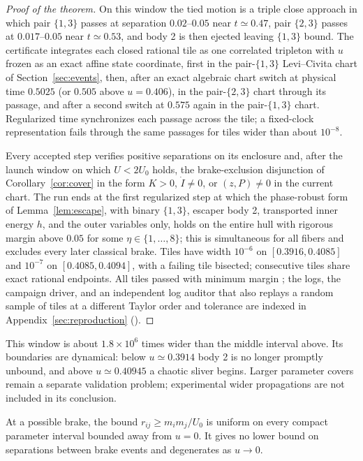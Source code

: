 \begin{proof}[Proof of the theorem]
On this window the tied motion is a triple close approach in which pair
$\{1,3\}$ passes at separation $0.02$--$0.05$ near $t\simeq0.47$, pair
$\{2,3\}$ passes at $0.017$--$0.05$ near $t\simeq0.53$, and body 2 is then
ejected leaving $\{1,3\}$ bound. The certificate integrates each closed
rational tile as one correlated tripleton with $u$ frozen as an exact affine
state coordinate, first in the pair-$\{1,3\}$ Levi--Civita chart of
Section~\ref{sec:events}, then, after an exact algebraic chart switch at
physical time $0.5025$ (or $0.505$ above $u=0.406$), in the pair-$\{2,3\}$
chart through its passage, and after a second switch at $0.575$ again in
the pair-$\{1,3\}$ chart. Regularized time synchronizes each passage across
the tile; a fixed-clock representation fails through the same passages for
tiles wider than about $10^{-8}$.

Every accepted step verifies positive separations on its enclosure and,
after the launch window on which $U<2U_0$ holds, the brake-exclusion
disjunction of Corollary~\ref{cor:cover} in the form $K>0$, $\dot I\ne0$,
or $(z,P)\ne0$ in the current chart. The run ends at the first regularized
step at which the phase-robust form of Lemma~\ref{lem:escape}, with binary
$\{1,3\}$, escaper body 2, transported inner energy $h$, and the outer
variables only, holds on the entire hull with rigorous margin above $0.05$
for some $\eta\in\{1,\dots,8\}$; this is simultaneous for all fibers and
excludes every later classical brake. Tiles have width $10^{-6}$ on
$[0.3916,0.4085]$ and $10^{-7}$ on $[0.4085,0.4094]$, with a failing tile
bisected; consecutive tiles share exact rational endpoints. All
\WINDOWTILES{} tiles passed with minimum margin \WINDOWMARGIN{}; the logs,
the campaign driver, and an independent log auditor that also replays a
random sample of tiles at a different Taylor order and tolerance are indexed
in Appendix~\ref{sec:reproduction} ().
\end{proof}

This window is about $1.8\times10^6$ times wider than the middle interval
above. Its boundaries are dynamical: below $u\simeq0.3914$ body 2 is no
longer promptly unbound, and above $u\simeq0.40945$ a chaotic sliver
begins.
 Larger
parameter covers remain a separate validation problem; experimental wider
propagations are not included in its conclusion.

At a possible brake, the bound $r_{ij}\ge m_im_j/U_0$ is uniform on every
compact parameter interval bounded away from $u=0$. It gives no lower
bound on separations between brake events and degenerates as $u\to0$.

